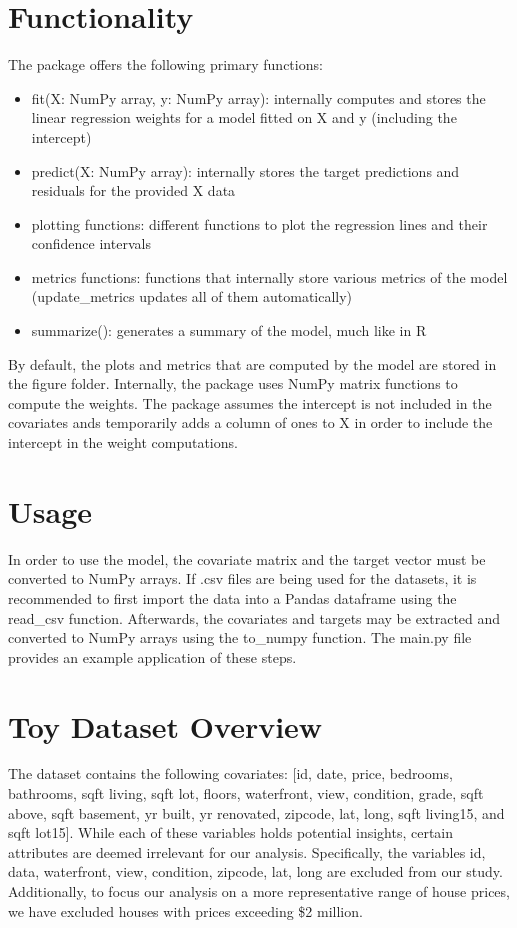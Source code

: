 \documentclass[11pt,a4paper]{article}
\begin{document}
\section{Functionality}
The package offers the following primary functions:
\begin{itemize}
    \item fit(X: NumPy array, y: NumPy array): internally computes and stores the linear regression weights for a model fitted on X and y (including the intercept)
    \item predict(X: NumPy array): internally stores the target predictions and residuals for the provided X data
    \item plotting functions: different functions to plot the regression lines and their confidence intervals
    \item metrics functions: functions that internally store various metrics of the model (update\_metrics updates all of them automatically)
    \item summarize(): generates a summary of the model, much like in R
\end{itemize}
By default, the plots and metrics that are computed by the model are stored in the figure folder. Internally, the package uses NumPy matrix functions to compute the weights.
The package assumes the intercept is not included in the covariates ands temporarily adds a column of ones to X in order to include the intercept in the weight computations.

\newpage
\section{Usage}
In order to use the model, the covariate matrix and the target vector must be converted to NumPy arrays.
If .csv files are being used for the datasets, it is recommended to first import the data into a Pandas dataframe using the read\_csv function.
Afterwards, the covariates and targets may be extracted and converted to NumPy arrays using the to\_numpy function. The main.py file provides an example application of these steps.

\newpage
\section{Toy Dataset Overview}
The dataset contains the following covariates: [id, date, price, bedrooms,
bathrooms, sqft living, sqft lot, floors, waterfront, view, condition, grade,
sqft above, sqft basement, yr built, yr renovated, zipcode, lat, long, sqft
living15, and sqft lot15]. While each of these variables holds potential
insights, certain attributes are deemed irrelevant for our analysis.
Specifically, the variables id, data, waterfront, view, condition, zipcode,
lat, long are excluded from our study. Additionally, to focus our analysis on a
more representative range of house prices, we have excluded houses with prices
exceeding \$2 million.
\end{document}
